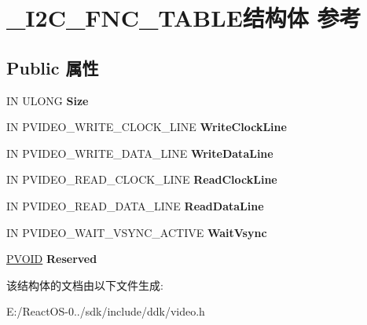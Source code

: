 \hypertarget{struct___i2_c___f_n_c___t_a_b_l_e}{}\section{\+\_\+\+I2\+C\+\_\+\+F\+N\+C\+\_\+\+T\+A\+B\+L\+E结构体 参考}
\label{struct___i2_c___f_n_c___t_a_b_l_e}
\subsection*{Public 属性}
\begin{DoxyCompactItemize}
\item 
\mbox{\label{struct___i2_c___f_n_c___t_a_b_l_e_ac3a9aab4ba227346cd7cf70ba7c37571}} 
IN U\+L\+O\+NG {\bfseries Size}
\item 
\mbox{\label{struct___i2_c___f_n_c___t_a_b_l_e_ad0e04a6a4232db1f239f27b6c6e82367}} 
IN P\+V\+I\+D\+E\+O\+\_\+\+W\+R\+I\+T\+E\+\_\+\+C\+L\+O\+C\+K\+\_\+\+L\+I\+NE {\bfseries Write\+Clock\+Line}
\item 
\mbox{\label{struct___i2_c___f_n_c___t_a_b_l_e_ad050d8512b41702aa1a865267e0829bc}} 
IN P\+V\+I\+D\+E\+O\+\_\+\+W\+R\+I\+T\+E\+\_\+\+D\+A\+T\+A\+\_\+\+L\+I\+NE {\bfseries Write\+Data\+Line}
\item 
\mbox{\label{struct___i2_c___f_n_c___t_a_b_l_e_af424e1d6bbe3923a07c2244f7d76fad4}} 
IN P\+V\+I\+D\+E\+O\+\_\+\+R\+E\+A\+D\+\_\+\+C\+L\+O\+C\+K\+\_\+\+L\+I\+NE {\bfseries Read\+Clock\+Line}
\item 
\mbox{\label{struct___i2_c___f_n_c___t_a_b_l_e_a50d1c98489e2b969ee25660aba6cf781}} 
IN P\+V\+I\+D\+E\+O\+\_\+\+R\+E\+A\+D\+\_\+\+D\+A\+T\+A\+\_\+\+L\+I\+NE {\bfseries Read\+Data\+Line}
\item 
\mbox{\label{struct___i2_c___f_n_c___t_a_b_l_e_a9f0f024b697987553d4ea4d65cce9982}} 
IN P\+V\+I\+D\+E\+O\+\_\+\+W\+A\+I\+T\+\_\+\+V\+S\+Y\+N\+C\+\_\+\+A\+C\+T\+I\+VE {\bfseries Wait\+Vsync}
\item 
\mbox{\label{struct___i2_c___f_n_c___t_a_b_l_e_a472beba4c9e6d688d2c72eb862312d92}} 
\hyperlink{interfacevoid}{P\+V\+O\+ID} {\bfseries Reserved}
\end{DoxyCompactItemize}


该结构体的文档由以下文件生成\+:\begin{DoxyCompactItemize}
\item 
E\+:/\+React\+O\+S-\/0../sdk/include/ddk/video.\+h\end{DoxyCompactItemize}
